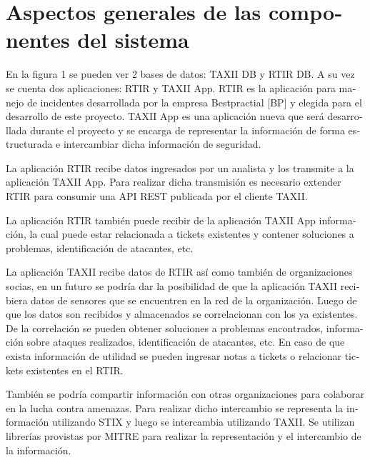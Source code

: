 	
	\bigskip
	
	\section[Aspectos generales de las componentes del sistema]{\foreignlanguage{spanish}{Aspectos generales de las
			componentes del sistema}}
	\foreignlanguage{spanish}{En la figura 1 se pueden ver 2 bases de datos: TAXII DB y RTIR DB. A su vez se cuenta dos
		aplicaciones: RTIR y TAXII App. RTIR es la aplicación para manejo de incidentes desarrollada por la empresa
		Bestpractial [BP] y elegida para el desarrollo de este proyecto. TAXII App es una aplicación nueva que será
		desarrollada durante el proyecto y se encarga de representar la información de forma estructurada e intercambiar dicha
		información de seguridad.}
	
	\foreignlanguage{spanish}{La aplicación RTIR recibe datos ingresados por un analista y los transmite a la aplicación
		TAXII App. Para realizar dicha transmisión es necesario extender RTIR para consumir una API REST publicada por el
		cliente TAXII.}
	
	\foreignlanguage{spanish}{La aplicación RTIR también puede recibir de la aplicación TAXII App información, la cual puede
		estar relacionada a tickets existentes y contener soluciones a problemas, identificación de atacantes, etc.}
	
	
	\bigskip
	
	\foreignlanguage{spanish}{La aplicación TAXII recibe datos de RTIR así como también de organizaciones socias, en un
		futuro se podría dar la posibilidad de que la aplicación TAXII recibiera datos de sensores que se encuentren en la red
		de la organización. Luego de que los datos son recibidos y almacenados se correlacionan con los ya existentes. De la
		correlación se pueden obtener soluciones a problemas encontrados, información sobre ataques realizados, identificación
		de atacantes, etc. En caso de que exista información de utilidad se pueden ingresar notas a tickets o relacionar
		tickets existentes en el RTIR.}
	
	\foreignlanguage{spanish}{También se podría compartir información con otras organizaciones para colaborar en la lucha
		contra amenazas. Para realizar dicho intercambio se representa la información utilizando STIX y luego se intercambia
		utilizando TAXII. Se utilizan librerías provistas por MITRE para realizar la representación y el intercambio de la
		información.}
	
	
	\bigskip
	
